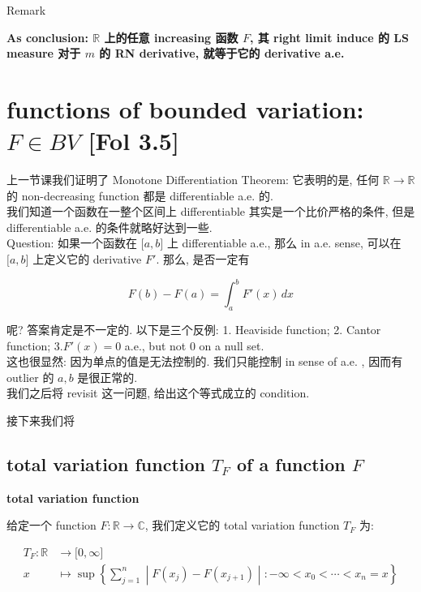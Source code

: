 \documentclass{qlnotes-export}
\begin{document}
\begin{qlremark}{Remark}

\textbf{As conclusion: \(\mathbb{R}\) 上的任意 increasing 函数 \(F\), 其 right limit induce 的 LS measure 对于 \(m\) 的 RN derivative, 就等于它的 derivative a.e.}

\end{qlremark}

\section{\texorpdfstring{functions of bounded variation: \(F \in BV\) {[}Fol 3.5{]}}{functions of bounded variation: F \textbackslash in BV {[}Fol 3.5{]}}}

上一节课我们证明了 Monotone Differentiation Theorem: 它表明的是, 任何 \({\mathbb{R}}\rightarrow{\mathbb{R}}\) 的 non-decreasing function 都是 differentiable a.e. 的.\\
我们知道一个函数在一整个区间上 differentiable 其实是一个比价严格的条件, 但是 differentiable a.e. 的条件就略好达到一些.\\
Question: 如果一个函数在 \(\lbrack a,b\rbrack\) 上 differentiable a.e., 那么 in a.e. sense, 可以在 \(\lbrack a,b\rbrack\) 上定义它的 derivative \(F'\). 那么, 是否一定有

\[F(b) - F(a) = \int_{a}^{b}F'(x)\, dx\]

呢? 答案肯定是不一定的. 以下是三个反例: 1. Heaviside function; 2. Cantor function; 3.\(F'(x) = 0\) a.e., but not \(0\) on a null set.\\
这也很显然: 因为单点的值是无法控制的. 我们只能控制 in sense of a.e. , 因而有 outlier 的 \(a,b\) 是很正常的.\\
我们之后将 revisit 这一问题, 给出这个等式成立的 condition.

接下来我们将

\subsection{\texorpdfstring{total variation function \(T_{F}\) of a function \(F\)}{total variation function T\_\{F\} of a function F}}\label{total-variation-function-t_f-of-a-function-f}

\begin{definition}{\protect{}\label{kn-total-variation-function}{\textbf{total
variation function}}}

给定一个 function \(F:{\mathbb{R}}\rightarrow{\mathbb{C}}\), 我们定义它的 total variation function \(T_{F}\) 为:

\[\begin{matrix}
{T_{F}:{\mathbb{R}}} & {\rightarrow\lbrack 0,\infty\rbrack} \\
x & {\mapsto\sup\left\{ \sum\limits_{j = 1}^{n} \middle| F(x_{j}) - F(x_{j + 1}) \middle| : - \infty < x_{0} < \cdots < x_{n} = x \right\}}
\end{matrix}\]

\end{definition}
\end{document}
